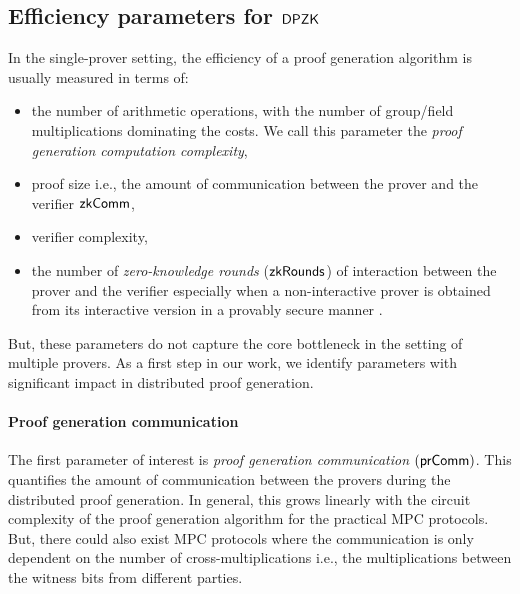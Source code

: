 \subsection{Efficiency parameters for $\mathsf{DPZK}$}
In the single-prover setting, the efficiency of a proof generation algorithm is usually measured in terms of: 
\begin{itemize}
\item the number of arithmetic operations, with the number of group/field multiplications dominating the costs. We call this parameter the \textit{proof generation computation complexity},
\item proof size i.e., the amount of communication between the prover and the verifier $\mathsf{zkComm}$,
\item verifier complexity,
\item the number of \textit{zero-knowledge rounds} ($\mathsf{zkRounds}$) of interaction between the prover and the verifier especially when a non-interactive prover is obtained from its interactive version in a provably secure manner \cite{BCS16}.
\end{itemize} 
But, these parameters do not capture the core bottleneck in the setting of multiple provers.  
As a first step in our work, we identify parameters with significant impact in distributed proof generation. 

\paragraph{Proof generation communication}
The first parameter of interest is \textit{proof generation communication} $(\mathsf{prComm})$. This quantifies the amount of communication between the provers during the distributed proof generation. In general, this grows linearly with the circuit complexity of the proof generation algorithm for the practical MPC protocols. 
But, there could also exist MPC protocols where the communication is only dependent on the number of cross-multiplications i.e., the multiplications between the witness bits from different parties. %

